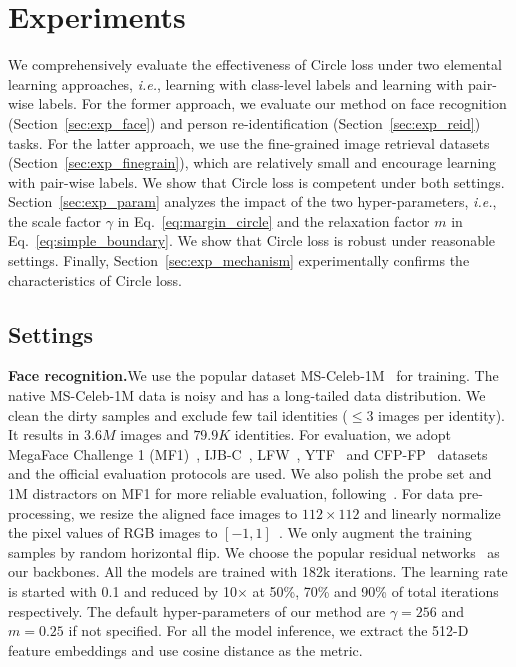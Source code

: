 \documentclass[10pt,twocolumn,letterpaper]{article}
\begin{document}
\section{Experiments}

We comprehensively evaluate the effectiveness of Circle loss under two elemental learning approaches, \emph{i.e.}, learning with class-level labels and learning with pair-wise labels. For the former approach, we evaluate our method on face recognition (Section~\ref{sec:exp_face}) and person re-identification (Section~\ref{sec:exp_reid}) tasks. For the latter approach, we use the fine-grained image retrieval datasets (Section~\ref{sec:exp_finegrain}), which are relatively small and encourage learning with pair-wise labels. We show that Circle loss is competent under both settings. 
Section~\ref{sec:exp_param} analyzes the impact of the two hyper-parameters, \emph{i.e.}, the scale factor $\gamma$ in Eq.~\ref{eq:margin_circle} and the relaxation factor $m$ in Eq.~\ref{eq:simple_boundary}. We show that Circle loss is robust under reasonable settings. Finally, Section~\ref{sec:exp_mechanism} experimentally confirms the characteristics of Circle loss.

\subsection{Settings}

\textbf{Face recognition.}\quad We use the popular dataset MS-Celeb-1M~\cite{guo2016ms} for training. The native MS-Celeb-1M data is noisy and has a long-tailed data distribution. We clean the dirty samples and exclude few tail identities ($\le3$ images per identity). It results in $3.6M$ images and $79.9K$ identities. For evaluation, we adopt MegaFace Challenge 1 (MF1)~\cite{kemelmacher2016megaface}, IJB-C~\cite{maze2018iarpa}, LFW~\cite{LFWTech}, YTF~\cite{wolf2011face} and CFP-FP~\cite{cfp-paper} datasets and the official evaluation protocols are used. We also polish the probe set and 1M distractors on MF1 for more reliable evaluation, following~\cite{deng2019arcface}. %
For data pre-processing, we resize the aligned face images to $112\times112$ and linearly normalize the pixel values of RGB images to $[-1,1]$~\cite{wen2016discriminative,liu2017sphereface,Wang_2018_CVPR}. We only augment the training samples by random horizontal flip. We choose the popular residual networks~\cite{he2016deep} as our backbones.
All the models are trained with 182k iterations. The learning rate is started with 0.1 and reduced by 10$\times$ at 50\%, 70\% and 90\% of total iterations respectively. The default hyper-parameters of our method are $\gamma=256$ and $m=0.25$ if not specified. %
For all the model inference, we extract the 512-D feature embeddings and use cosine distance as the metric.
\end{document}
